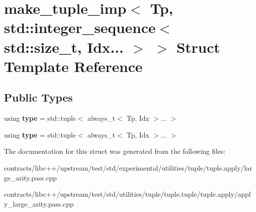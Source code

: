 \hypertarget{structmake__tuple__imp_3_01_tp_00_01std_1_1integer__sequence_3_01std_1_1size__t_00_01_idx_8_8_8_01_4_01_4}{}\section{make\+\_\+tuple\+\_\+imp$<$ Tp, std\+:\+:integer\+\_\+sequence$<$ std\+:\+:size\+\_\+t, Idx... $>$ $>$ Struct Template Reference}
\label{structmake__tuple__imp_3_01_tp_00_01std_1_1integer__sequence_3_01std_1_1size__t_00_01_idx_8_8_8_01_4_01_4}
\subsection*{Public Types}
\begin{DoxyCompactItemize}
\item 
\mbox{\label{structmake__tuple__imp_3_01_tp_00_01std_1_1integer__sequence_3_01std_1_1size__t_00_01_idx_8_8_8_01_4_01_4_a2d7ec4eacb5391df137897d791082ced}} 
using {\bfseries type} = std\+::tuple$<$ always\+\_\+t$<$ Tp, Idx $>$... $>$
\item 
\mbox{\label{structmake__tuple__imp_3_01_tp_00_01std_1_1integer__sequence_3_01std_1_1size__t_00_01_idx_8_8_8_01_4_01_4_a2d7ec4eacb5391df137897d791082ced}} 
using {\bfseries type} = std\+::tuple$<$ always\+\_\+t$<$ Tp, Idx $>$... $>$
\end{DoxyCompactItemize}


The documentation for this struct was generated from the following files\+:\begin{DoxyCompactItemize}
\item 
contracts/libc++/upstream/test/std/experimental/utilities/tuple/tuple.\+apply/large\+\_\+arity.\+pass.\+cpp\item 
contracts/libc++/upstream/test/std/utilities/tuple/tuple.\+tuple/tuple.\+apply/apply\+\_\+large\+\_\+arity.\+pass.\+cpp\end{DoxyCompactItemize}
